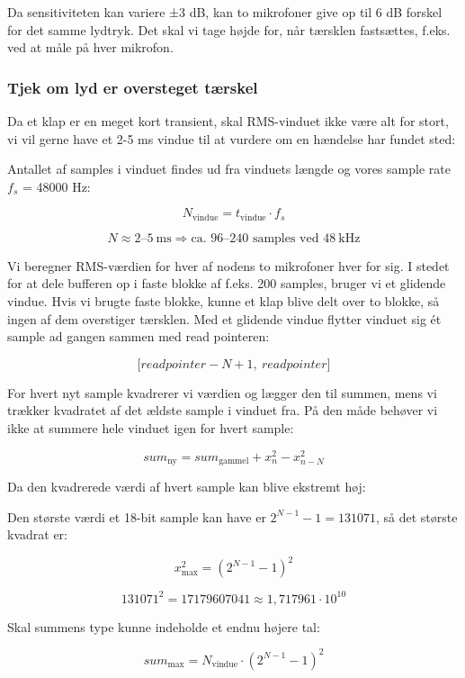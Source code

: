 \documentclass[
  danish,
]{article}
\begin{document}
Da sensitiviteten kan variere ±3 dB, kan to mikrofoner give op til 6 dB
forskel for det samme lydtryk. Det skal vi tage højde for, når tærsklen
fastsættes, f.eks. ved at måle på hver mikrofon.

\subsubsection{Tjek om lyd er oversteget
tærskel}\label{tjek-om-lyd-er-oversteget-tuxe6rskel}

Da et klap er en meget kort transient, skal RMS-vinduet ikke være alt
for stort, vi vil gerne have et 2-5 ms vindue til at vurdere om en
hændelse har fundet sted:

Antallet af samples i vinduet findes ud fra vinduets længde og vores
sample rate \(f_{s}\) = 48000 Hz:

\[N_{\mathrm{vindue}} = t_{\mathrm{vindue}} \cdot f_{s}\]

\[N \approx 2\text{--}5\ \mathrm{ms} \Longrightarrow \text{ca. } 96\text{--}240 \text{ samples ved } 48\ \mathrm{kHz}\]

Vi beregner RMS-værdien for hver af nodens to mikrofoner hver for sig. I
stedet for at dele bufferen op i faste blokke af f.eks. 200 samples,
bruger vi et glidende vindue. Hvis vi brugte faste blokke, kunne et klap
blive delt over to blokke, så ingen af dem overstiger tærsklen. Med et
glidende vindue flytter vinduet sig ét sample ad gangen sammen med read
pointeren:

\[\lbrack \mathit{readpointer} - N + 1,\ \mathit{readpointer}\rbrack\]

For hvert nyt sample kvadrerer vi værdien og lægger den til summen, mens
vi trækker kvadratet af det ældste sample i vinduet fra. På den måde
behøver vi ikke at summere hele vinduet igen for hvert sample:

\[\mathit{sum}_{\mathrm{ny}} = \mathit{sum}_{\mathrm{gammel}} + x_{n}^{2} - x_{n - N}^{2}\]

Da den kvadrerede værdi af hvert sample kan blive ekstremt høj:

Den største værdi et 18-bit sample kan have er \(2^{N - 1} - 1 = 131071\), så det største kvadrat er:

\[x_{\max}^{2} = \left( 2^{N - 1} - 1 \right)^{2}\]

\[131071^{2} = 17179607041 \approx 1{,}717961 \cdot 10^{10}\]

Skal summens type kunne indeholde et endnu højere tal:

\[\mathit{sum}_{\max} = N_{\mathrm{vindue}} \cdot \left( 2^{N - 1} - 1 \right)^{2}\]
\end{document}
